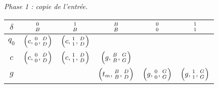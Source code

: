 \begin{center}
	\emph{\small Phase 1 : copie de l'entrée.}
	
	\smallskip
	\renewcommand{\arraystretch}{1.25}
	\begin{tabular}{|c||c|c|c|c|c|}
		\hline
		$\delta$ 
			& $\twocoord{0}{B}$ 
			& $\twocoord{1}{B}$ 
			& $\twocoord{B}{B}$ 
			& $\twocoord{0}{0}$ 
			& $\twocoord{1}{1}$ \\
		\hline
		\hline
		$q_0$ 
			& $\left( c, \twocoord{0}{0}, \twocoord{D}{D} \right)$ 
			& $\left( c, \twocoord{1}{1}, \twocoord{D}{D} \right)$
			&                   
			&                   
			&                                                      \\
		\hline
		$c$ 
			& $\left( c, \twocoord{0}{0}, \twocoord{D}{D} \right)$ 
			& $\left( c, \twocoord{1}{1}, \twocoord{D}{D} \right)$
			& $\left( g, \twocoord{B}{B}, \twocoord{G}{G} \right)$
			&                   
			&                                                      \\
		\hline
		$g$ 
			&                     
			&                   
			& $\left( t_m, \twocoord{B}{B}, \twocoord{D}{D} \right)$
			& $\left( g  , \twocoord{0}{0}, \twocoord{G}{G} \right)$ 
			& $\left( g  , \twocoord{1}{1}, \twocoord{G}{G} \right)$ \\
		\hline
	\end{tabular}
	\renewcommand{\arraystretch}{1}
\end{center}



